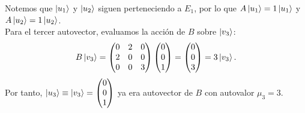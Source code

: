 \begin{ejemplobox}
\begin{itemize}
\begin{equation}
        \end{equation}
    \end{itemize}
    Notemos que $\left| u_1 \right\rangle$ y $\left| u_2 \right\rangle$ siguen perteneciendo a $E_1$, por lo que $A\left| u_1 \right\rangle = 1\left| u_1 \right\rangle$ y $A\left| u_2 \right\rangle = 1\left| u_2 \right\rangle$.\\
    Para el tercer autovector, evaluamos la acción de $B$ sobre $\left| v_3 \right\rangle$:
    \begin{equation}
        B\left| v_3 \right\rangle = \begin{pmatrix} 0 & 2 & 0 \\ 2 & 0 & 0 \\ 0 & 0 & 3 \end{pmatrix}\begin{pmatrix} 0 \\ 0 \\ 1 \end{pmatrix} = \begin{pmatrix} 0 \\ 0 \\ 3 \end{pmatrix} = 3\left| v_3 \right\rangle.
    \end{equation}
    Por tanto, $\left| u_3 \right\rangle \equiv \left| v_3 \right\rangle = \begin{pmatrix} 0 \\ 0 \\ 1 \end{pmatrix}$ ya era autovector de $B$ con autovalor $\mu_3 = 3$.


\end{ejemplobox}
